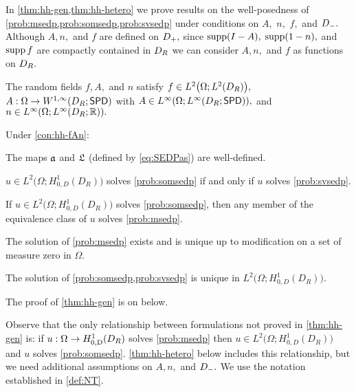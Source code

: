 In \cref{thm:hh-gen,thm:hh-hetero} we prove results on the well-posedness of \cref{prob:msedp,prob:somsedp,prob:svsedp} under conditions on $A,$ $n,$ $f,$ and $D_{-}.$ Although $A,n,$ and $f$ are defined on $D_{+},$ since $\operatorname{supp}(I-A),$ $\operatorname{supp}(1-n),$ and $\operatorname{supp} f$ are compactly contained in  $D_{R}$ we can consider $A,n,$ and $f$ as functions on $D_{R}.$

\label{con:hh-fAn}
The random fields $f, A,$ and $n$ satisfy $f \in \LtOLtDR,$  $A:\Omega \rightarrow \WoiDRRRdtd$ with $A \in \LiOLiDRRRdtd,$ and $n \in \LiOLiDRRR.$
\econ

\label{thm:hh-gen}
Under \cref{con:hh-fAn}:
\bit
\item The maps $\mathfrak{a}$ and $\mathfrak{L}$ (defined by \eqref{eq:SEDPas}) are well-defined.
\item $u \in %
L^2\big(\Omega;H_{0,D}^1(D_R)\big)$
solves \cref{prob:somsedp} if and only if $u$ solves \cref{prob:svsedp}.
\item If $u \in
L^2\big(\Omega;H_{0,D}^1(D_R)\big)$
solves \cref{prob:somsedp}, then any member of the equivalence class of $u$ solves \cref{prob:msedp}.
\item The solution of \cref{prob:msedp} exists and is unique up to modification on a set of measure zero in $\Omega.$
\item The solution of \cref{prob:somsedp,prob:svsedp} is unique in $L^2\big(\Omega;H_{0,D}^1(D_R)\big)$. %
\eit
\enth

The proof of \cref{thm:hh-gen} is on  below.

Observe that the only relationship between formulations not proved in \cref{thm:hh-gen} is: if $u:\Omega\rightarrow \HozDDR$  solves \cref{prob:msedp} then $u \in 
L^2\big(\Omega;H_{0,D}^1(D_R)\big)$
and $u$ solves \cref{prob:somsedp}. \cref{thm:hh-hetero} below includes this relationship, but we need additional assumptions on $A,n,$ and $D_{-}.$ We use the notation established in \cref{def:NT}.


